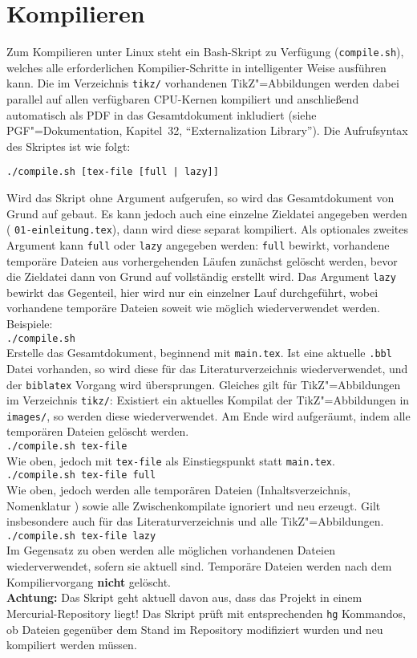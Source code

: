 \section{Kompilieren}\label{sec:kompilieren}
%
Zum Kompilieren unter Linux steht ein Bash-Skript zu Verfügung (\texttt{compile.sh}), welches alle erforderlichen Kompilier-Schritte in intelligenter Weise ausführen kann. Die im Verzeichnis \texttt{tikz/} vorhandenen TikZ"=Abbildungen werden dabei parallel auf allen verfügbaren CPU-Kernen kompiliert und anschließend automatisch als PDF in das Gesamtdokument inkludiert (siehe PGF"=Dokumentation, Kapitel~32, \enquote{Externalization Library}). Die Aufrufsyntax des Skriptes ist wie folgt:
%
\begin{center}
  \texttt{./compile.sh [tex-file [full | lazy]]}
\end{center}
%
Wird das Skript ohne Argument aufgerufen, so wird das Gesamtdokument von Grund auf gebaut. Es kann jedoch auch eine einzelne Zieldatei angegeben werden (\zB{} \texttt{01-einleitung.tex}), dann wird diese separat kompiliert. Als optionales zweites Argument kann \texttt{full} oder \texttt{lazy} angegeben werden: \texttt{full} bewirkt, \ggf{} vorhandene temporäre Dateien aus vorhergehenden Läufen zunächst gelöscht werden, bevor die Zieldatei dann von Grund auf vollständig erstellt wird. Das Argument \texttt{lazy} bewirkt das Gegenteil, hier wird nur ein einzelner Lauf durchgeführt, wobei vorhandene temporäre Dateien soweit wie möglich wiederverwendet werden. Beispiele:\\[1em]
%
\texttt{./compile.sh}\\Erstelle das Gesamtdokument, beginnend mit \texttt{main.tex}. Ist eine aktuelle \texttt{.bbl} Datei vorhanden, so wird diese für das Literaturverzeichnis wiederverwendet, und der \texttt{biblatex} Vorgang wird übersprungen. Gleiches gilt für TikZ"=Abbildungen im Verzeichnis \texttt{tikz/}: Existiert ein aktuelles Kompilat der TikZ"=Abbildungen in \texttt{images/}, so werden diese wiederverwendet. Am Ende wird aufgeräumt, indem alle temporären Dateien gelöscht werden.\\[1em]
%
\texttt{./compile.sh tex-file}\\Wie oben, jedoch mit \texttt{tex-file} als Einstiegspunkt statt \texttt{main.tex}.\\[1em]
%
\texttt{./compile.sh tex-file full}\\Wie oben, jedoch werden alle temporären Dateien (Inhaltsverzeichnis, Nomenklatur \etc{}) sowie alle Zwischenkompilate ignoriert und neu erzeugt. Gilt insbesondere auch für das Literaturverzeichnis und alle TikZ"=Abbildungen.\\[1em]
%
\texttt{./compile.sh tex-file lazy}\\Im Gegensatz zu oben werden alle möglichen vorhandenen Dateien wiederverwendet, sofern sie aktuell sind. Temporäre Dateien werden nach dem Kompiliervorgang \textbf{nicht} gelöscht.\\[1em]
%
\textbf{Achtung:} Das Skript geht aktuell davon aus, dass das Projekt in einem Mercurial-Repository liegt! Das Skript prüft mit entsprechenden \texttt{hg} Kommandos, ob Dateien gegenüber dem Stand im Repository modifiziert wurden und neu kompiliert werden müssen.
%
%
